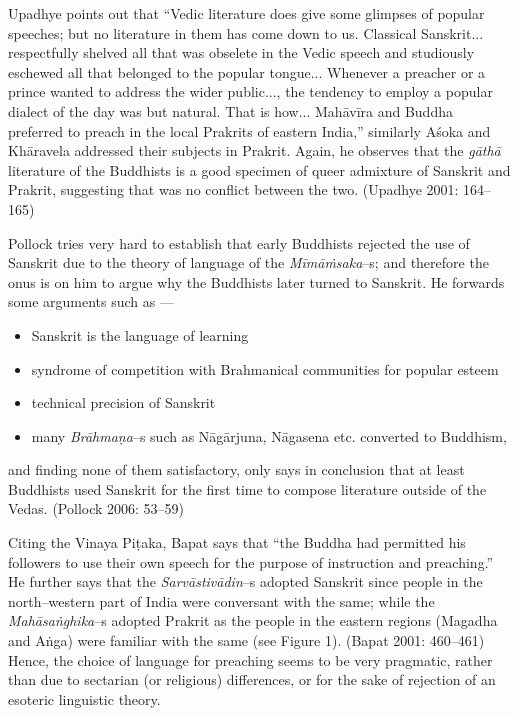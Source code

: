Upadhye points out that “Vedic literature does give some glimpses of popular speeches; but no literature in them has come down to us. Classical Sanskrit... respectfully shelved all that was obselete in the Vedic speech and studiously eschewed all that belonged to the popular tongue... Whenever a preacher or a prince wanted to address the wider public..., the tendency to employ a popular dialect of the day was but natural. That is how... Mahāvīra and Buddha preferred to preach in the local Prakrits of eastern India,” similarly Aśoka and Khāravela addressed their subjects in Prakrit. Again, he observes that the \textit{gāthā} literature of the Buddhists is a good specimen of queer admixture of Sanskrit and Prakrit, suggesting that was no conflict between the two. (Upadhye 2001: 164–165)

Pollock tries very hard to establish that early Buddhists rejected the use of Sanskrit due to the theory of language of the \textit{Mīmāṁsaka}–s; and therefore the onus is on him to argue why the Buddhists later turned to Sanskrit. He forwards some arguments such as —

\begin{itemize}
\item Sanskrit is the language of learning

 \item syndrome of competition with Brahmanical communities for popular esteem

 \item technical precision of Sanskrit

 \item many \textit{Brāhmaṇa}–s such as Nāgārjuna, Nāgasena etc. converted to Buddhism,

\end{itemize}

and finding none of them satisfactory, only says in conclusion that at least Buddhists used Sanskrit for the first time to compose literature outside of the Vedas. (Pollock 2006: 53–59)

Citing the Vinaya Piṭaka, Bapat says that “the Buddha had permitted his followers to use their own speech for the purpose of instruction and preaching.” He further says that the \textit{Sarvāstivādin}–s adopted Sanskrit since people in the north–western part of India were conversant with the same; while the \textit{Mahāsaṅghika}–s adopted Prakrit as the people in the eastern regions (Magadha and Aṅga) were familiar with the same (see Figure 1). (Bapat 2001: 460–461) Hence, the choice of language for preaching seems to be very pragmatic, rather than due to sectarian (or religious) differences, or for the sake of rejection of an esoteric linguistic theory.

